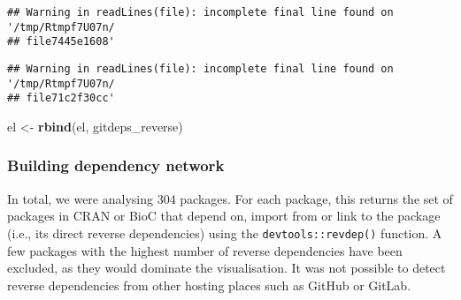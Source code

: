 \documentclass[]{article}
\newenvironment{Shaded}{\begin{snugshade}}{\end{snugshade}}
\newcommand{\DataTypeTok}[1]{\textcolor[rgb]{0.13,0.29,0.53}{#1}}
\newcommand{\KeywordTok}[1]{\textcolor[rgb]{0.13,0.29,0.53}{\textbf{#1}}}
\newcommand{\NormalTok}[1]{#1}
\newcommand{\OperatorTok}[1]{\textcolor[rgb]{0.81,0.36,0.00}{\textbf{#1}}}
\newcommand{\StringTok}[1]{\textcolor[rgb]{0.31,0.60,0.02}{#1}}
\begin{document}
\begin{Shaded}
\end{Shaded}

\begin{verbatim}
## Warning in readLines(file): incomplete final line found on '/tmp/Rtmpf7U07n/
## file7445e1608'
\end{verbatim}

\begin{verbatim}
## Warning in readLines(file): incomplete final line found on '/tmp/Rtmpf7U07n/
## file71c2f30cc'
\end{verbatim}

\begin{Shaded}
\begin{Highlighting}[]
\NormalTok{el <-}\StringTok{ }\KeywordTok{rbind}\NormalTok{(el, gitdeps_reverse)}
\end{Highlighting}
\end{Shaded}

\hypertarget{building-dependency-network}{%
\subsubsection*{Building dependency network}\label{building-dependency-network}}

In total, we were analysing 304 packages.
For each package, this returns the set of packages in CRAN or BioC that depend on, import from or link to the package (i.e., its direct reverse dependencies) using the \texttt{devtools::revdep()} function. A few packages with the highest number of reverse dependencies have been excluded, as they would dominate the visualisation.
It was not possible to detect reverse dependencies from other hosting places such as GitHub or GitLab.
\end{document}
